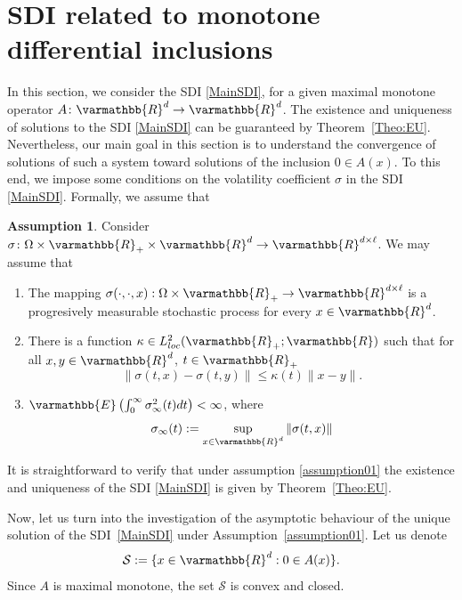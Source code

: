 \documentclass[11pt,reqno]{article}
\let\mathbb=\varmathbb
\newcommand{\R}{\mathbb{R}}
\newcommand{\1}{\mathds{1}}
\numberwithin{equation}{section}  %
\theoremstyle{plain}
\theoremstyle{definition}
\newtheorem{assumption}{Assumption}
\theoremstyle{remark}
\numberwithin{theorem}{section}
\numberwithin{remark}{section}
\numberwithin{example}{section}
\begin{document}
\section{SDI related to monotone differential inclusions}\label{Section4}
In this section, we consider the SDI \eqref{MainSDI}, for a given maximal monotone operator $A\colon \mathbb{R}^d \to \mathbb{R}^d$. 
The existence and uniqueness of solutions to the SDI \eqref{MainSDI} can be guaranteed by Theorem~\ref{Theo:EU}. 
Nevertheless, our main goal in this section is to understand the convergence of solutions of such a system toward solutions of the inclusion $0 \in A(x)$. 
To this end, we impose some conditions on the volatility coefficient $\sigma$ in the SDI \eqref{MainSDI}. 
Formally, we assume that

 \begin{assumption}\label{assumption01}
    Consider $\sigma \colon \Omega \times \R_+ \times \mathbb{R}^d \to \mathbb{R}^{d\times \ell}$. We may assume that 
\begin{enumerate}[label=\alph*)]
    \item The mapping $\sigma (\cdot,\cdot,  x): \Omega\times \R_+   \to \mathbb{R}^{d\times \ell}$ is a progresively measurable stochastic process for every $x\in \mathbb{R}^d$.
    \item  There is a function $\kappa\in L^2_{loc}(\R_+;\R)$ such that for all $x,y\in \R^d$, $t\in \R_+$
    \begin{equation*} 
        \|\sigma(t,x)-\sigma(t,y)\|\leq \kappa(t)\|x-y\|.
    \end{equation*}
    \item $\mathbb{E} \left( \int_0^\infty  \sigma^2_\infty (t)  dt\right)  < \infty$, where $$ \sigma_\infty(t) := \sup_{x\in \R^d}\|\sigma(t,x)\| $$
    \end{enumerate}
 \end{assumption}
    It is straightforward to verify that under assumption \eqref{assumption01} the existence and uniqueness of the SDI \eqref{MainSDI} is given by  Theorem~\ref{Theo:EU}.
    
Now, let us turn into the investigation of  the asymptotic behaviour of the unique solution 
of the SDI~\eqref{MainSDI} under Assumption~\eqref{assumption01}. Let us denote
\[
    \mathcal{S} := \{x \in \mathbb{R}^d : 0 \in A(x)\}.
\]
Since $A$ is maximal monotone, the set $\mathcal{S}$ is convex and closed.
\end{document}
